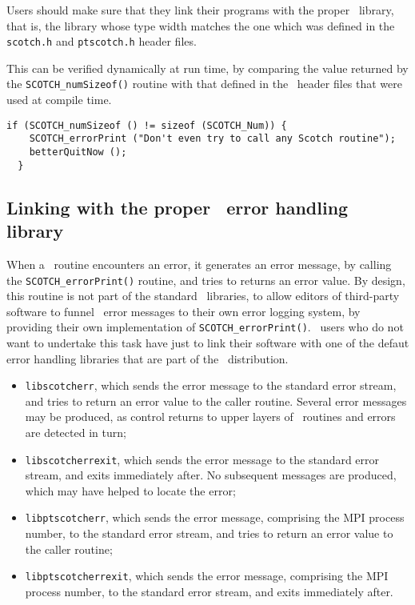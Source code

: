 Users should make sure that they link their programs with the proper
\scotch\ library, that is, the library whose type width matches the
one which was defined in the \texttt{scotch.h} and \texttt{ptscotch.h}
header files.

This can be verified dynamically at run time, by comparing the value
returned by the \texttt{SCOTCH\_\lbt num\lbt Sizeof()} routine with
that defined in the \scotch\ header files that were used at compile
time.

\begin{center}
\end{center}

\begin{lstlisting}[style=language-c]
  if (SCOTCH_numSizeof () != sizeof (SCOTCH_Num)) {
    SCOTCH_errorPrint ("Don't even try to call any Scotch routine");
    betterQuitNow ();
  }
\end{lstlisting}

\subsection{Linking with the proper \scotch\ error handling library}
\label{sec-c-scotcherr}

When a \scotch\ routine encounters an error, it generates an error
message, by calling the \texttt{SCOTCH\_\lbt error\lbt Print()}
routine, and tries to returns an error value. By design, this routine
is not part of the standard \scotch\ libraries, to allow editors of
third-party software to funnel \scotch\ error messages to their own
error logging system, by providing their own implementation of
\texttt{SCOTCH\_\lbt error\lbt Print()}. \scotch\ users who do not
want to undertake this task have just to link their software with one
of the defaut error handling libraries that are part of the
\scotch\ distribution.
\begin{itemize}
\item
\texttt{libscotcherr}, which sends the error message to the standard
error stream, and tries to return an error value to the caller
routine. Several error messages may be produced, as control returns to
upper layers of \scotch\ routines and errors are detected in turn;
\item
\texttt{libscotcherrexit}, which sends the error message to the standard
error stream, and exits immediately after. No subsequent messages are
produced, which may have helped to locate the error;
\item
\texttt{libptscotcherr}, which sends the error message, comprising the
MPI process number, to the standard error stream, and tries to return
an error value to the caller routine;
\item
\texttt{libptscotcherrexit}, which sends the error message, comprising
the MPI process number, to the standard error stream, and exits
immediately after.
\end{itemize}

